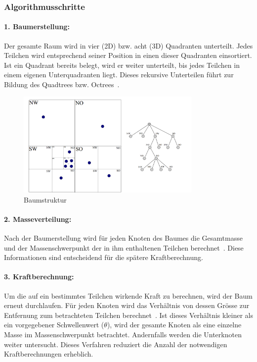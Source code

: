 \documentclass[a4paper,12pt,twoside]{article}
\begin{document}
\subsubsection{Algorithmusschritte}

\paragraph{1. Baumerstellung:}
Der gesamte Raum wird in vier (2D) bzw. acht (3D) Quadranten unterteilt. Jedes Teilchen wird entsprechend seiner Position in einen dieser Quadranten einsortiert. Ist ein Quadrant bereits belegt, wird er weiter unterteilt, bis jedes Teilchen in einem eigenen Unterquadranten liegt. Dieses rekursive Unterteilen führt zur Bildung des Quadtrees bzw. Octrees~\cite{Wu2024}.

\begin{figure}[H]
	\centering
	\includegraphics[width=0.8\textwidth]{Baumstruktur.png}
	\caption[Eintrag in Abbildungsverzeichnis von Baumstruktur]{Baumstruktur}
	\label{Baumstruktur}
\end{figure}

\paragraph{2. Masseverteilung:}
Nach der Baumerstellung wird für jeden Knoten des Baumes die Gesamtmasse und der Massenschwerpunkt der in ihm enthaltenen Teilchen berechnet~\cite{Burtscher&Pingali2011}. Diese Informationen sind entscheidend für die spätere Kraftberechnung.

\paragraph{3. Kraftberechnung:}
Um die auf ein bestimmtes Teilchen wirkende Kraft zu berechnen, wird der Baum erneut durchlaufen. Für jeden Knoten wird das Verhältnis von dessen Grösse zur Entfernung zum betrachteten Teilchen berechnet~\cite{BarnesHutBeltoforion}. Ist dieses Verhältnis kleiner als ein vorgegebener Schwellenwert ($\theta$), wird der gesamte Knoten als eine einzelne Masse im Massenschwerpunkt betrachtet. Andernfalls werden die Unterknoten weiter untersucht. Dieses Verfahren reduziert die Anzahl der notwendigen Kraftberechnungen erheblich.
\end{document}
